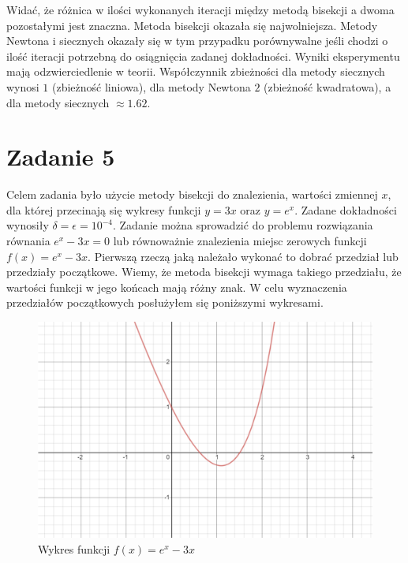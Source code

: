 \documentclass[]{article}
\begin{document}
	Widać, że różnica w ilości wykonanych iteracji między metodą bisekcji a dwoma pozostałymi jest znaczna. Metoda bisekcji okazała się najwolniejsza. Metody Newtona i siecznych okazały się w tym przypadku porównywalne jeśli chodzi o ilość iteracji potrzebną do osiągnięcia zadanej dokładności. Wyniki eksperymentu mają odzwierciedlenie w teorii. Współczynnik zbieżności dla metody siecznych wynosi $1$ (zbieżność liniowa), dla metody Newtona $2$ (zbieżność kwadratowa), a dla metody siecznych $\approx1.62$.
	
	\clearpage
	
	\section*{Zadanie 5}
	Celem zadania było użycie metody bisekcji do znalezienia, wartości zmiennej $x$, dla której przecinają się wykresy funkcji $y=3x$ oraz $y=e^x$. Zadane dokładności wynosiły $\delta = \epsilon = 10^{-4}$. Zadanie można sprowadzić do problemu rozwiązania równania $e^x - 3x = 0$ lub równoważnie znalezienia miejsc zerowych funkcji $f(x) = e^x - 3x$. Pierwszą rzeczą jaką należało wykonać to dobrać przedział lub przedziały początkowe. Wiemy, że metoda bisekcji wymaga takiego przedziału, że wartości funkcji w jego końcach mają różny znak. W celu wyznaczenia przedziałów początkowych posłużyłem się poniższymi wykresami.
	
	\begin{figure}[!htbp]
		\includegraphics[width=\textwidth]{task5plot}
		\centering
		\caption{Wykres funkcji $f(x) = e^x - 3x$}
	\end{figure}
	
\end{document}
